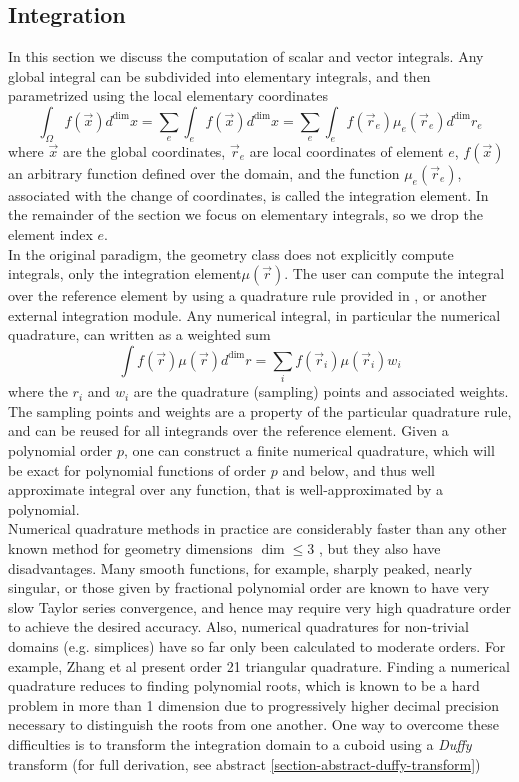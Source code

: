\subsection{Integration}
\label{sec:theory:integration}

In this section we discuss the computation of scalar and vector integrals. Any global integral can be subdivided into elementary integrals, and then parametrized using the local elementary coordinates
\[
	\int_{\Omega} f(\vec{x}) d^{\dim} x =
	\sum_e \int_e f(\vec{x}) d^{\dim} x =
	\sum_e \int_e f(\vec{r}_e) \mu_e(\vec{r}_e) d^{\dim} r_e \]
where $\vec{x}$ are the global coordinates, $\vec{r}_e$ are local coordinates of element $e$, $f(\vec{x})$ an arbitrary function defined over the domain, and the function $\mu_e(\vec{r}_e)$, associated with the change of coordinates, is called the integration element. In the remainder of the section we focus on elementary integrals, so we drop the element index $e$. \\

\noindent
In the original \dunegeom{} paradigm, the geometry class does not explicitly compute integrals, only the integration element$\mu(\vec{r})$. The user can compute the integral over the reference element by using a quadrature rule \cite{abramowitz+1970} provided in \dunegeom{}, or another external integration module. Any numerical integral, in particular the numerical quadrature, can written as a weighted sum
\[ \int f(\vec{r}) \mu(\vec{r}) d^{\dim} r = \sum_i f(\vec{r}_i) \mu(\vec{r}_i) w_i  \]
where the $r_i$ and $w_i$ are the quadrature (sampling) points and associated weights. The sampling points and weights are a property of the particular quadrature rule, and can be reused for all integrands over the reference element. Given a polynomial order $p$, one can construct a finite numerical quadrature, which will be exact for polynomial functions of order $p$ and below, and thus well approximate integral over any function, that is well-approximated by a polynomial. \\

\noindent
Numerical quadrature methods in practice are considerably faster than any other known method for geometry dimensions $\dim \leq 3$ \cite{schurer2003}, but they also have disadvantages. Many smooth functions, for example, sharply peaked, nearly singular, or those given by fractional polynomial order are known to have very slow Taylor series convergence, and hence may require very high quadrature order to achieve the desired accuracy. Also, numerical quadratures for non-trivial domains (e.g. simplices) have so far only been calculated to moderate orders. For example, Zhang et al \cite{zhang+2008} present order 21 triangular quadrature. Finding a numerical quadrature reduces to finding polynomial roots, which is known to be a hard problem in more than 1 dimension due to progressively higher decimal precision necessary to distinguish the roots from one another. One way to overcome these difficulties is to transform the integration domain to a cuboid using a \textit{Duffy} transform (for full derivation, see abstract \ref{section-abstract-duffy-transform})

